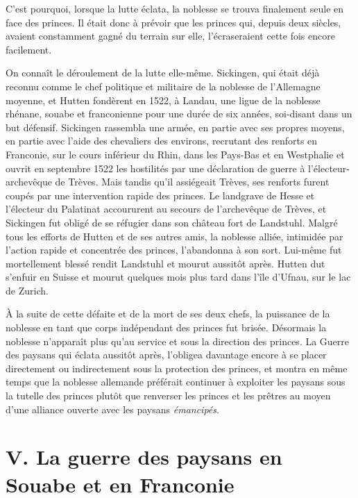\documentclass[french,twoside]{book} %
\newcommand\chapteropen{} %
\newcommand\chapterclose{} %
\begin{document}
C’est pourquoi, lorsque la lutte éclata, la noblesse se trouva finalement seule en face des princes. Il était donc à prévoir que les princes qui, depuis deux siècles, avaient constamment gagné du terrain sur elle, l’écraseraient cette fois encore facilement.\par
On connaît le déroulement de la lutte elle-même. Sickingen, qui était déjà reconnu comme le chef politique et militaire de la noblesse de l’Allemagne moyenne, et Hutten fondèrent en 1522, à Landau, une ligue de la noblesse rhénane, souabe et franconienne pour une durée de six années, soi-disant dans un but défensif. Sickingen rassembla une armée, en partie avec ses propres moyens, en partie avec l’aide des chevaliers des environs, recrutant des renforts en Franconie, sur le cours inférieur du Rhin, dans les Pays-Bas et en Westphalie et ouvrit en septembre 1522 les hostilités par une déclaration de guerre à l’électeur-archevêque de Trèves. Mais tandis qu’il assiégeait Trèves, ses renforts furent coupés par une intervention rapide des princes. Le landgrave de Hesse et l’électeur du Palatinat accoururent au secours de l’archevêque de Trèves, et Sickingen fut obligé de se réfugier dans son château fort de Landstuhl. Malgré tous les efforts de Hutten et de ses autres amis, la noblesse alliée, intimidée par l’action rapide et concentrée des princes, l’abandonna à son sort. Lui-même fut mortellement blessé rendit Landstuhl et mourut aussitôt après. Hutten dut s’enfuir en Suisse et mourut quelques mois plus tard dans l’île d’Ufnau, sur le lac de Zurich.\par
À la suite de cette défaite et de la mort de ses deux chefs, la puissance de la noblesse en tant que corps indépendant des princes fut brisée. Désormais la noblesse n’apparaît plus qu’au service et sous la direction des princes. La Guerre des paysans qui éclata aussitôt après, l’obligea davantage encore à se placer directement ou indirectement sous la protection des princes, et montra en même temps que la noblesse allemande préférait continuer à exploiter les paysans sous la tutelle des princes plutôt que renverser les princes et les prêtres au moyen d’une alliance ouverte avec les paysans \emph{émancipés}.
\chapterclose


\chapteropen
\chapter[{V. La guerre des paysans en Souabe et en Franconie}]{V. La guerre des paysans en Souabe et en Franconie}\renewcommand{\leftmark}{V. La guerre des paysans en Souabe et en Franconie}
\end{document}
